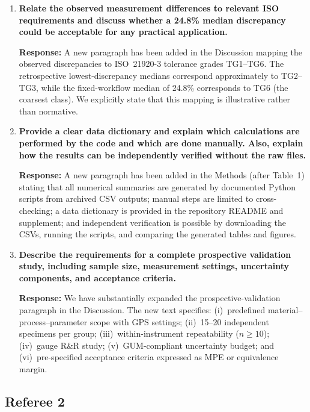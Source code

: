 \documentclass[10pt]{article}
\begin{document}
\begin{enumerate}[leftmargin=*, label=\textbf{Comment \arabic*.}, ref=\arabic*]
\item \textbf{Relate the observed measurement differences to relevant ISO requirements and discuss whether a 24.8\% median discrepancy could be acceptable for any practical application.}

\textbf{Response:} A new paragraph has been added in the Discussion mapping the observed discrepancies to ISO~21920-3 tolerance grades TG1--TG6. The retrospective lowest-discrepancy medians correspond approximately to TG2--TG3, while the fixed-workflow median of 24.8\% corresponds to TG6 (the coarsest class). We explicitly state that this mapping is illustrative rather than normative.

\item \textbf{Provide a clear data dictionary and explain which calculations are performed by the code and which are done manually. Also, explain how the results can be independently verified without the raw files.}

\textbf{Response:} A new paragraph has been added in the Methods (after Table~1) stating that all numerical summaries are generated by documented Python scripts from archived CSV outputs; manual steps are limited to cross-checking; a data dictionary is provided in the repository README and supplement; and independent verification is possible by downloading the CSVs, running the scripts, and comparing the generated tables and figures.

\item \textbf{Describe the requirements for a complete prospective validation study, including sample size, measurement settings, uncertainty components, and acceptance criteria.}

\textbf{Response:} We have substantially expanded the prospective-validation paragraph in the Discussion. The new text specifies: (i)~predefined material--process--parameter scope with GPS settings; (ii)~15--20 independent specimens per group; (iii)~within-instrument repeatability ($n \geq 10$); (iv)~gauge R\&R study; (v)~GUM-compliant uncertainty budget; and (vi)~pre-specified acceptance criteria expressed as MPE or equivalence margin.

\end{enumerate}

\subsection*{Referee 2}
\end{document}

